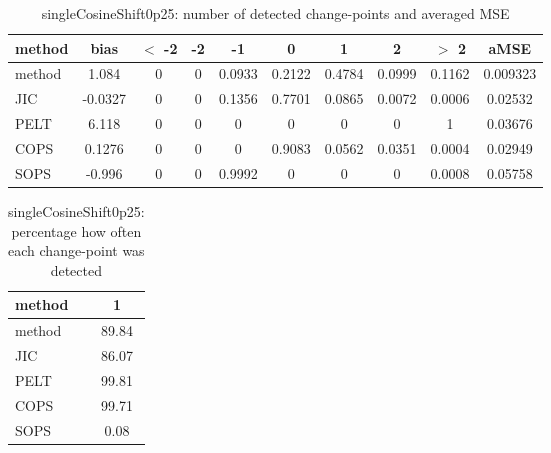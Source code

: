 \begin{table}[ht]
\centering
\begin{tabular}{l|c|ccccccc|c}
  \hline
method & bias & $<$ -2 & -2 & -1 & 0 & 1 & 2 & $>$ 2 & aMSE \\ 
  \hline
method & 1.084 &     0 &     0 & 0.0933 & 0.2122 & 0.4784 & 0.0999 & 0.1162 & 0.009323 \\ 
  JIC & -0.0327 &     0 &     0 & 0.1356 & 0.7701 & 0.0865 & 0.0072 & 0.0006 & 0.02532 \\ 
  PELT & 6.118 &     0 &     0 &     0 &     0 &     0 &     0 &     1 & 0.03676 \\ 
  COPS & 0.1276 &     0 &     0 &     0 & 0.9083 & 0.0562 & 0.0351 & 0.0004 & 0.02949 \\ 
  SOPS & -0.996 &     0 &     0 & 0.9992 &     0 &     0 &     0 & 0.0008 & 0.05758 \\ 
   \hline
\end{tabular}
\caption{singleCosineShift0p25: number of detected change-points and averaged MSE} 
\label{tab:singleCosineShift0p25Njumps}
\end{table}
\begin{table}[ht]
\centering
\begin{tabular}{l|c}
  \hline
method & 1 \\ 
  \hline
method &  89.84 \\ 
  JIC &  86.07 \\ 
  PELT &  99.81 \\ 
  COPS &  99.71 \\ 
  SOPS &   0.08 \\ 
   \hline
\end{tabular}
\caption{singleCosineShift0p25: percentage how often each change-point was detected} 
\label{tab:singleCosineShift0p25Detections}
\end{table}
